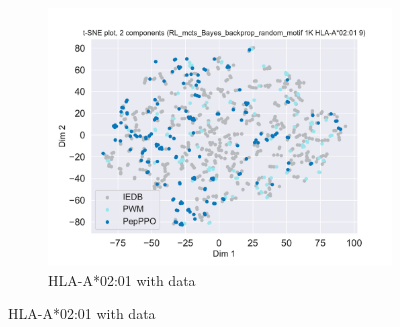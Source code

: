 \documentclass[letterpaper]{article}
\begin{document}
\begin{figure}[!t] 
	\centering
	\begin{subfigure}[b]{.48\linewidth}
	\includegraphics[width=\linewidth]{plots/HLA-A0201_RL_mcts_Bayes_backprop_random_motif_1K_9.pdf}
	\caption{HLA-A*02:01 with data}
	\label{fig:case:hla-a0201}
	\end{subfigure}

\end{figure}
\end{document}
